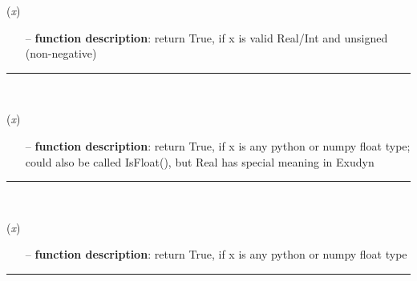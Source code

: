 \begin{itemize}[leftmargin=1.4cm]
\begin{flushleft}
\label{sec:advancedUtilities:IsValidURealInt}
({\it x})
\end{flushleft}
\setlength{\itemindent}{0.7cm}
\begin{itemize}[leftmargin=0.7cm]
\item[--]
{\bf function description}: return True, if x is valid Real/Int and unsigned (non-negative)
\vspace{12pt}\end{itemize}
%
\noindent\rule{8cm}{0.75pt}\vspace{1pt} \\ 
\begin{flushleft}
\label{sec:advancedUtilities:IsReal}
({\it x})
\end{flushleft}
\setlength{\itemindent}{0.7cm}
\begin{itemize}[leftmargin=0.7cm]
\item[--]
{\bf function description}: return True, if x is any python or numpy float type; could also be called IsFloat(), but Real has special meaning in Exudyn
\vspace{12pt}\end{itemize}
%
\noindent\rule{8cm}{0.75pt}\vspace{1pt} \\ 
\begin{flushleft}
\label{sec:advancedUtilities:IsInteger}
({\it x})
\end{flushleft}
\setlength{\itemindent}{0.7cm}
\begin{itemize}[leftmargin=0.7cm]
\item[--]
{\bf function description}: return True, if x is any python or numpy float type
\vspace{12pt}\end{itemize}
%
\noindent\rule{8cm}{0.75pt}\vspace{1pt} \\ 
\begin{flushleft}
\label{sec:advancedUtilities:IsVector}

\end{flushleft}
\end{itemize}
